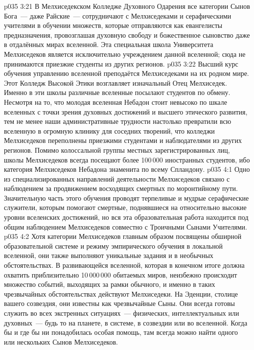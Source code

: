 \vs p035 3:21 В Мелхиседекском Колледже Духовного Одарения все категории Сынов Бога~--- даже Райские~--- сотрудничают с Мелхиседеками и серафическими учителями в обучении множеств, которые отправляются как евангелисты предназначения, провозглашая духовную свободу и божественное сыновство даже в отдалённых мирах вселенной. Эта специальная школа Университета Мелхиседеков является исключительно учреждением данной вселенной; сюда не принимаются приезжие студенты из других регионов.
\vs p035 3:22 Высший курс обучения управлению вселенной преподаётся Мелхиседеками на их родном мире. Этот Колледж Высокой Этики возглавляет изначальный Отец Мелхиседек. Именно в эти школы различные вселенные посылают студентов по обмену. Несмотря на то, что молодая вселенная Небадон стоит невысоко по шкале вселенных с точки зрения духовных достижений и высшего этического развития, тем не менее наши административные трудности настолько превратили всю вселенную в огромную клинику для соседних творений, что колледжи Мелхиседеков переполнены приезжими студентами и наблюдателями из других регионов. Помимо колоссальной группы местных зарегистрированных лиц, школы Мелхиседеков всегда посещают более 100\,000 иностранных студентов, ибо категория Мелхиседеков Небадона знаменита по всему Спландону.
\vs p035 4:1 Одно из специализированных направлений деятельности Мелхиседеков связано с наблюдением за продвижением восходящих смертных по моронтийному пути. Значительную часть этого обучения проводят терпеливые и мудрые серафические служители, которым помогают смертные, поднявшиеся на относительно высокие уровни вселенских достижений, но вся эта образовательная работа находится под общим наблюдением Мелхиседеков совместно с Троичными Сынами Учителями.
\vs p035 4:2 \pc Хотя категории Мелхиседеков главным образом посвящены обширной образовательной системе и режиму эмпирического обучения в локальной вселенной, они также выполняют уникальные задания и в необычных обстоятельствах. В развивающейся вселенной, которая в конечном итоге должна охватить приблизительно 10\,000\,000 обитаемых миров, неизбежно происходит множество событий, выходящих за рамки обычного, и именно в таких чрезвычайных обстоятельствах действуют Мелхиседеки. На Эденции, столице вашего созвездия, они известны как чрезвычайные Сыны. Они всегда готовы служить во всех экстренных ситуациях~--- физических, интеллектуальных или духовных~--- будь то на планете, в системе, в созвездии или во вселенной. Когда бы и где бы ни понадобилась особая помощь, там всегда можно найти одного или нескольких Сынов Мелхиседеков.
